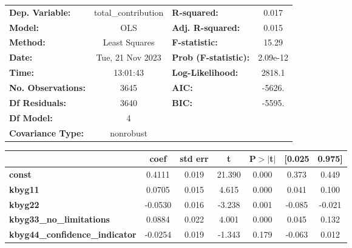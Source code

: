 \begin{center}
\begin{tabular}{lclc}
\toprule
\textbf{Dep. Variable:}                & total\_contribution & \textbf{  R-squared:         } &     0.017   \\
\textbf{Model:}                        &         OLS         & \textbf{  Adj. R-squared:    } &     0.015   \\
\textbf{Method:}                       &    Least Squares    & \textbf{  F-statistic:       } &     15.29   \\
\textbf{Date:}                         &   Tue, 21 Nov 2023  & \textbf{  Prob (F-statistic):} &  2.09e-12   \\
\textbf{Time:}                         &       13:01:43      & \textbf{  Log-Likelihood:    } &    2818.1   \\
\textbf{No. Observations:}             &          3645       & \textbf{  AIC:               } &    -5626.   \\
\textbf{Df Residuals:}                 &          3640       & \textbf{  BIC:               } &    -5595.   \\
\textbf{Df Model:}                     &             4       & \textbf{                     } &             \\
\textbf{Covariance Type:}              &      nonrobust      & \textbf{                     } &             \\
\bottomrule
\end{tabular}
\begin{tabular}{lcccccc}
                                       & \textbf{coef} & \textbf{std err} & \textbf{t} & \textbf{P$> |$t$|$} & \textbf{[0.025} & \textbf{0.975]}  \\
\midrule
\textbf{const}                         &       0.4111  &        0.019     &    21.390  &         0.000        &        0.373    &        0.449     \\
\textbf{kbyg11}                        &       0.0705  &        0.015     &     4.615  &         0.000        &        0.041    &        0.100     \\
\textbf{kbyg22}                        &      -0.0530  &        0.016     &    -3.238  &         0.001        &       -0.085    &       -0.021     \\
\textbf{kbyg33\_no\_limitations}       &       0.0884  &        0.022     &     4.001  &         0.000        &        0.045    &        0.132     \\
\textbf{kbyg44\_confidence\_indicator} &      -0.0254  &        0.019     &    -1.343  &         0.179        &       -0.063    &        0.012     \\

\end{tabular}
\end{center}
